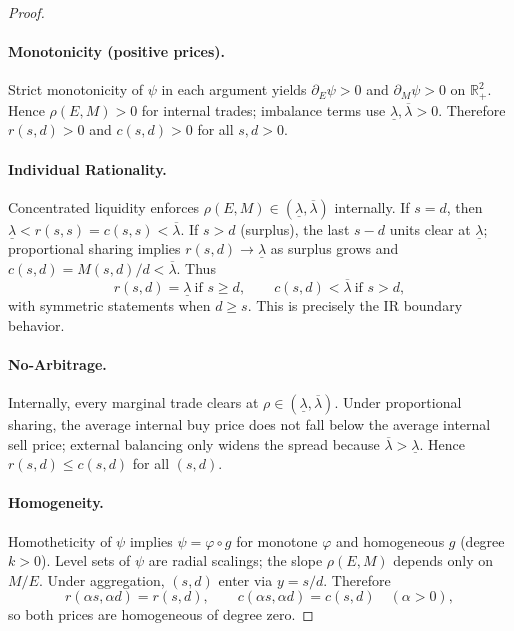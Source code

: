 \documentclass[12pt, notitlepage]{article}
\begin{document}
\begin{proof}
\paragraph{Monotonicity (positive prices).}
Strict monotonicity of \(\psi\) in each argument yields \(\partial_E\psi>0\) and \(\partial_M\psi>0\) on \(\mathbb{R}^2_+\).
Hence \(\rho(E,M)>0\) for internal trades; imbalance terms use \(\underline{\lambda},\overline{\lambda}>0\). Therefore \(r(s,d)>0\) and \(c(s,d)>0\) for all \(s,d>0\).

\paragraph{Individual Rationality.}
Concentrated liquidity enforces \(\rho(E,M)\in(\underline{\lambda},\overline{\lambda})\) internally. If \(s=d\), then
\(\underline{\lambda} < r(s,s)=c(s,s) < \overline{\lambda}\).
If \(s>d\) (surplus), the last \(s-d\) units clear at \(\underline{\lambda}\); proportional sharing implies
\(r(s,d)\to \underline{\lambda}\) as surplus grows and \(c(s,d)=M(s,d)/d<\overline{\lambda}\).
Thus
\[
r(s,d)=\underline{\lambda}\ \text{if } s\ge d,\qquad
c(s,d)<\overline{\lambda}\ \text{if } s>d,
\]
with symmetric statements when \(d\ge s\). This is precisely the IR boundary behavior.

\paragraph{No-Arbitrage.}
Internally, every marginal trade clears at \(\rho\in(\underline{\lambda},\overline{\lambda})\). Under proportional sharing, the average internal buy price does not fall below the average internal sell price; external balancing only widens the spread because \(\overline{\lambda}>\underline{\lambda}\). Hence \(r(s,d)\le c(s,d)\) for all \((s,d)\).

\paragraph{Homogeneity.}
Homotheticity of \(\psi\) implies \(\psi=\varphi\circ g\) for monotone \(\varphi\) and homogeneous \(g\) (degree \(k>0\)). Level sets of \(\psi\) are radial scalings; the slope \(\rho(E,M)\) depends only on \(M/E\). Under aggregation, \((s,d)\) enter via \(y=s/d\). Therefore
\[
r(\alpha s,\alpha d)=r(s,d),\qquad c(\alpha s,\alpha d)=c(s,d)\quad(\alpha>0),
\]
so both prices are homogeneous of degree zero.


\end{proof}
\end{document}
